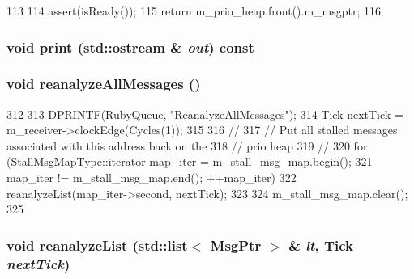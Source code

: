 \begin{DoxyCode}
113     {
114         assert(isReady());
115         return m_prio_heap.front().m_msgptr;
116     }
\end{DoxyCode}
\hypertarget{classMessageBuffer_ac55fe386a101fbae38c716067c9966a0}{
\subsubsection[{print}]{\setlength{\rightskip}{0pt plus 5cm}void print (std::ostream \& {\em out}) const}}
\label{classMessageBuffer_ac55fe386a101fbae38c716067c9966a0}
\hypertarget{classMessageBuffer_adfdac0293f076193ea9e70b12b54ecbe}{
\subsubsection[{reanalyzeAllMessages}]{\setlength{\rightskip}{0pt plus 5cm}void reanalyzeAllMessages ()}}
\label{classMessageBuffer_adfdac0293f076193ea9e70b12b54ecbe}



\begin{DoxyCode}
312 {
313     DPRINTF(RubyQueue, "ReanalyzeAllMessages\n");
314     Tick nextTick = m_receiver->clockEdge(Cycles(1));
315 
316     //
317     // Put all stalled messages associated with this address back on the
318     // prio heap
319     //
320     for (StallMsgMapType::iterator map_iter = m_stall_msg_map.begin();
321          map_iter != m_stall_msg_map.end(); ++map_iter) {
322         reanalyzeList(map_iter->second, nextTick);
323     }
324     m_stall_msg_map.clear();
325 }
\end{DoxyCode}
\hypertarget{classMessageBuffer_ac278f790c547f9db8b4bedc853b8ae63}{
\subsubsection[{reanalyzeList}]{\setlength{\rightskip}{0pt plus 5cm}void reanalyzeList ({\bf std::list}$<$ {\bf MsgPtr} $>$ \& {\em lt}, \/  {\bf Tick} {\em nextTick})}}
\label{classMessageBuffer_ac278f790c547f9db8b4bedc853b8ae63}



